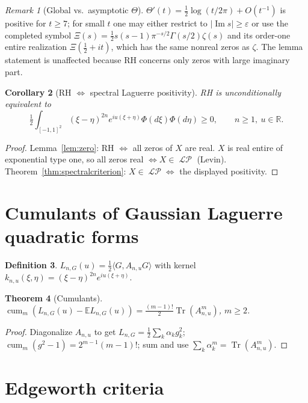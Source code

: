 \documentclass[11pt,reqno]{amsart}
\theoremstyle{plain}
\newtheorem{theorem}{Theorem}[section]
\newtheorem{corollary}[theorem]{Corollary}
\theoremstyle{definition}
\newtheorem{definition}[theorem]{Definition}
\theoremstyle{remark}
\newtheorem{remark}[theorem]{Remark}
\DeclareMathOperator{\cum}{cum}
\DeclareMathOperator{\Tr}{Tr}
\DeclareMathOperator{\LP}{\mathcal{LP}}
\newcommand{\R}{\mathbb R}
\newcommand{\E}{\mathbb E}
\begin{document}
\begin{remark}[Global vs.\ asymptotic \(\Theta\)]
\(\Theta'(t)=\tfrac12\log(t/2\pi)+O(t^{-1})\) is positive for \(t\ge7\);
for small \(t\) one may either restrict to \(|\operatorname{Im}s|\ge
\varepsilon\) or use the completed symbol
\(\Xi(s)=\tfrac12 s(s-1)\pi^{-s/2}\Gamma(s/2)\zeta(s)\) and its order-one
entire realization \(\Xi(\tfrac12+it)\), which has the same nonreal zeros
as \(\zeta\). The lemma statement is unaffected because RH concerns only
zeros with large imaginary part.
\end{remark}

\begin{corollary}[RH \(\iff\) spectral Laguerre positivity]\label{cor:RH}
RH is unconditionally equivalent to
\[
\tfrac12\int_{[-1,1]^2}(\xi-\eta)^{2n}e^{iu(\xi+\eta)}\Phi(d\xi)\Phi(d\eta)\ge0,
\qquad n\ge1,\ u\in\R.
\]
\end{corollary}

\begin{proof}
Lemma~\ref{lem:zero}: RH \(\iff\) all zeros of \(X\) are real. \(X\) is
real entire of exponential type one, so all zeros real \(\iff X\in\LP\)
(Levin). Theorem~\ref{thm:spectralcriterion}: \(X\in\LP\iff\) the
displayed positivity.
\end{proof}

\section{Cumulants of Gaussian Laguerre quadratic forms}

\begin{definition}
\(L_{n,G}(u)=\tfrac12\langle G,A_{n,u}G\rangle\) with kernel
\(k_{n,u}(\xi,\eta)=(\xi-\eta)^{2n}e^{iu(\xi+\eta)}\).
\end{definition}

\begin{theorem}[Cumulants]\label{thm:quadcum}
\(\cum_m(L_{n,G}(u)-\E L_{n,G}(u))=\tfrac{(m-1)!}{2}\Tr(A_{n,u}^m)\), \(m\ge2\).
\end{theorem}

\begin{proof}
Diagonalize \(A_{n,u}\) to get \(L_{n,G}=\tfrac12\sum_k\alpha_k g_k^2\);
\(\cum_m(g^2-1)=2^{m-1}(m-1)!\); sum and use
\(\sum_k\alpha_k^m=\Tr(A_{n,u}^m)\).
\end{proof}

\section{Edgeworth criteria}
\end{document}
